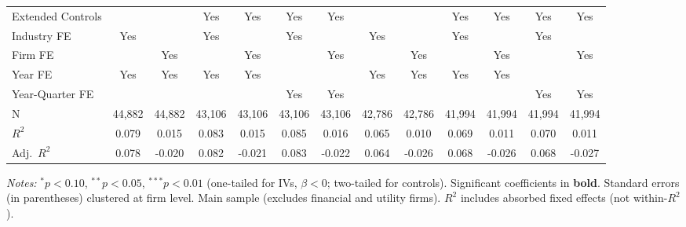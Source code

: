 \documentclass[11pt,a4paper]{article}
\begin{document}
\begin{table}[htbp]
\begin{tabular}{lcccccccccccc}
\midrule
Extended Controls &  &  & Yes & Yes & Yes & Yes &  &  & Yes & Yes & Yes & Yes \\
Industry FE & Yes &  & Yes &  & Yes &  & Yes &  & Yes &  & Yes &  \\
Firm FE &  & Yes &  & Yes &  & Yes &  & Yes &  & Yes &  & Yes \\
Year FE & Yes & Yes & Yes & Yes &  &  & Yes & Yes & Yes & Yes &  &  \\
Year-Quarter FE &  &  &  &  & Yes & Yes &  &  &  &  & Yes & Yes \\
\midrule
N & 44,882 & 44,882 & 43,106 & 43,106 & 43,106 & 43,106 & 42,786 & 42,786 & 41,994 & 41,994 & 41,994 & 41,994 \\
$R^2$ & 0.079 & 0.015 & 0.083 & 0.015 & 0.085 & 0.016 & 0.065 & 0.010 & 0.069 & 0.011 & 0.070 & 0.011 \\
Adj.~$R^2$ & 0.078 & -0.020 & 0.082 & -0.021 & 0.083 & -0.022 & 0.064 & -0.026 & 0.068 & -0.026 & 0.068 & -0.027 \\
\bottomrule
\end{tabular}
\begin{minipage}{\linewidth}
\vspace{2pt}\scriptsize
\textit{Notes:} $^{*}p<0.10$, $^{**}p<0.05$, $^{***}p<0.01$ (one-tailed for IVs, $\beta < 0$; two-tailed for controls).
 Significant coefficients in \textbf{bold}.
 Standard errors (in parentheses) clustered at firm level.
 Main sample (excludes financial and utility firms).
 $R^2$ includes absorbed fixed effects (not within-$R^2$).
\end{minipage}
\end{table}
\clearpage
\end{document}
